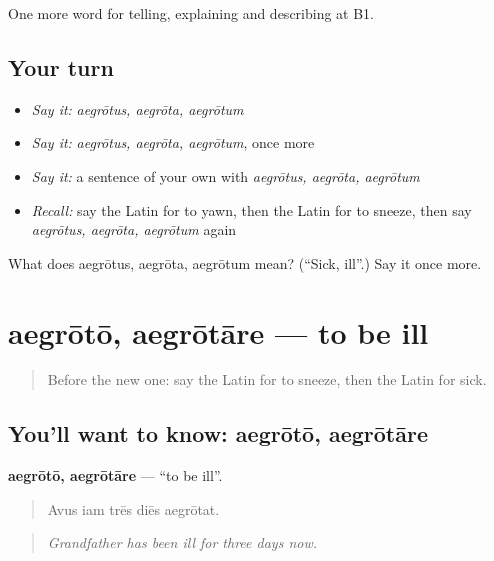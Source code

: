 \begin{grammarlens}[title={What you've built}]
One more word for telling, explaining and describing at B1.
\end{grammarlens}

\subsection*{Your turn}
\begin{itemize}
\raggedright
  \item \emph{Say it:} \emph{aegrōtus, aegrōta, aegrōtum}
  \item \emph{Say it:} \emph{aegrōtus, aegrōta, aegrōtum}, once more
  \item \emph{Say it:} a sentence of your own with \emph{aegrōtus, aegrōta, aegrōtum}
  \item \emph{Recall:} say the Latin for to yawn, then the Latin for to sneeze, then say \emph{aegrōtus, aegrōta, aegrōtum} again
\end{itemize}

\begin{tcolorbox}[breakable,colback=teal!4,colframe=teal!35!black,title={Before you move on}]
What does aegrōtus, aegrōta, aegrōtum mean? (\textquotedblleft{}Sick, ill\textquotedblright{}.) Say it once more.
\end{tcolorbox}
\section[aegrōtō, aegrōtāre]{aegrōtō, aegrōtāre — to be ill}

\label{lesson:LA-C521-aegroto}



\begin{quote}
Before the new one: say the Latin for to sneeze, then the Latin for sick.
\end{quote}

\subsection*{You'll want to know: aegrōtō, aegrōtāre}
\textbf{aegrōtō, aegrōtāre} — \textquotedblleft{}to be ill\textquotedblright{}.

\begin{quote}
Avus iam trēs diēs aegrōtat.
\end{quote}

\begin{quote}
\emph{Grandfather has been ill for three days now.}
\end{quote}

